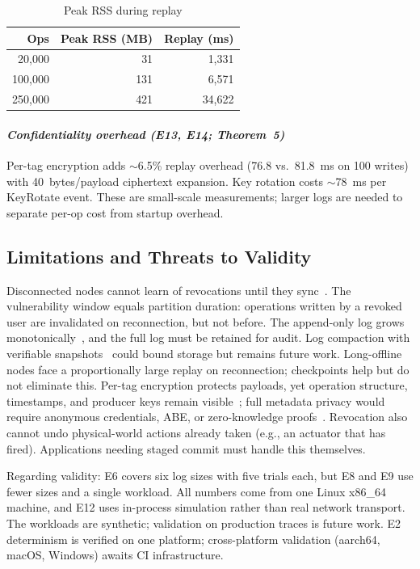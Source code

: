 \documentclass[10pt,journal,compsoc]{IEEEtran}
\begin{document}
\begin{table}[htbp]
\centering
\caption{Peak RSS during replay}
\label{tab:e9-memory-paperC}
\begin{tabular}{@{}rrr@{}}
\toprule
\textbf{Ops} & \textbf{Peak RSS (MB)} & \textbf{Replay (ms)} \\
\midrule
20,000  & 31   & 1,331  \\
100,000 & 131  & 6,571  \\
250,000 & 421  & 34,622 \\
\bottomrule
\end{tabular}
\end{table}

\paragraph*{\textit{Confidentiality overhead (E13, E14; Theorem~5)}}
Per-tag encryption adds $\sim$6.5\% replay overhead (76.8 vs.\ 81.8~ms on 100 writes) with 40~bytes/payload ciphertext expansion. Key rotation costs $\sim$78~ms per KeyRotate event. These are small-scale measurements; larger logs are needed to separate per-op cost from startup overhead.


\subsection{Limitations and Threats to Validity}\label{subsec:limitations-paperC}

Disconnected nodes cannot learn of revocations until they sync~\cite{10.1007/978-3-030-01950-1_48}. The vulnerability window equals partition duration: operations written by a revoked user are invalidated on reconnection, but not before. The append-only log grows monotonically~\cite{8805074}, and the full log must be retained for audit. Log compaction with verifiable snapshots~\cite{DEEPA2022209} could bound storage but remains future work. Long-offline nodes face a proportionally large replay on reconnection; checkpoints help but do not eliminate this. Per-tag encryption protects payloads, yet operation structure, timestamps, and producer keys remain visible~\cite{kohlweiss2015accountable}; full metadata privacy would require anonymous credentials, ABE, or zero-knowledge proofs~\cite{8888155,8664491,zhang2020attribute}. Revocation also cannot undo physical-world actions already taken (e.g., an actuator that has fired). Applications needing staged commit must handle this themselves.

Regarding validity: E6 covers six log sizes with five trials each, but E8 and E9 use fewer sizes and a single workload. All numbers come from one Linux x86\_64 machine, and E12 uses in-process simulation rather than real network transport. The workloads are synthetic; validation on production traces is future work. E2 determinism is verified on one platform; cross-platform validation (aarch64, macOS, Windows) awaits CI infrastructure.
\end{document}
